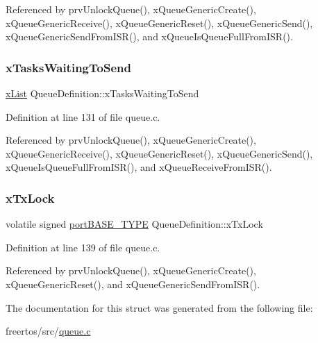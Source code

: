 Referenced by prv\+Unlock\+Queue(), x\+Queue\+Generic\+Create(), x\+Queue\+Generic\+Receive(), x\+Queue\+Generic\+Reset(), x\+Queue\+Generic\+Send(), x\+Queue\+Generic\+Send\+From\+I\+S\+R(), and x\+Queue\+Is\+Queue\+Full\+From\+I\+S\+R().

\mbox{\label{structQueueDefinition_a073ad0a31a51508395efd54599c73ee1}} 
\subsubsection{\texorpdfstring{x\+Tasks\+Waiting\+To\+Send}{xTasksWaitingToSend}}
{\footnotesize\ttfamily \hyperlink{list_8h_a3cee7d8d40380f66ac73b8825b5a0fb0}{x\+List} Queue\+Definition\+::x\+Tasks\+Waiting\+To\+Send}



Definition at line 131 of file queue.\+c.



Referenced by prv\+Unlock\+Queue(), x\+Queue\+Generic\+Create(), x\+Queue\+Generic\+Receive(), x\+Queue\+Generic\+Reset(), x\+Queue\+Generic\+Send(), x\+Queue\+Is\+Queue\+Full\+From\+I\+S\+R(), and x\+Queue\+Receive\+From\+I\+S\+R().

\mbox{\label{structQueueDefinition_a393aeeb16596b1be505014b57158c995}} 
\subsubsection{\texorpdfstring{x\+Tx\+Lock}{xTxLock}}
{\footnotesize\ttfamily volatile signed \hyperlink{portmacro_8h_a1ebe82d24d764ae4e352f7c3a9f92c01}{port\+B\+A\+S\+E\+\_\+\+T\+Y\+PE} Queue\+Definition\+::x\+Tx\+Lock}



Definition at line 139 of file queue.\+c.



Referenced by prv\+Unlock\+Queue(), x\+Queue\+Generic\+Create(), x\+Queue\+Generic\+Reset(), and x\+Queue\+Generic\+Send\+From\+I\+S\+R().



The documentation for this struct was generated from the following file\+:\begin{DoxyCompactItemize}
\item 
freertos/src/\hyperlink{queue_8c}{queue.\+c}\end{DoxyCompactItemize}
